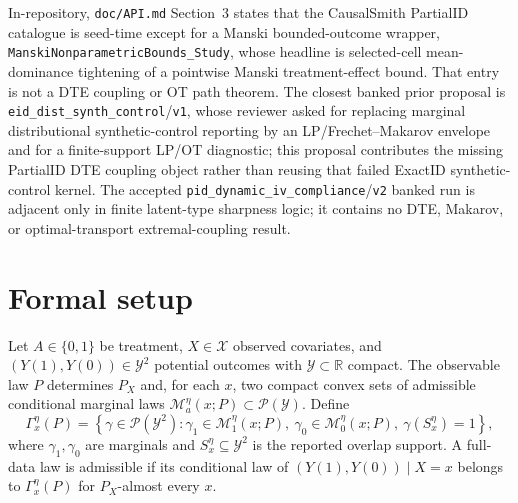 \documentclass[11pt]{article}
\theoremstyle{definition}
\theoremstyle{plain}
\theoremstyle{remark}
\begin{document}
In-repository, \texttt{doc/API.md} Section~3 states that the CausalSmith PartialID
catalogue is seed-time except for a Manski bounded-outcome wrapper,
\texttt{ManskiNonparametricBounds\_Study}, whose headline is selected-cell
mean-dominance tightening of a pointwise Manski treatment-effect bound.  That entry is
not a DTE coupling or OT path theorem.  The closest banked prior proposal is
\texttt{eid\_dist\_synth\_control}/\texttt{v1}, whose reviewer asked for replacing
marginal distributional synthetic-control reporting by an LP/Frechet--Makarov envelope
and for a finite-support LP/OT diagnostic; this proposal contributes the missing
PartialID DTE coupling object rather than reusing that failed ExactID synthetic-control
kernel.  The accepted \texttt{pid\_dynamic\_iv\_compliance}/\texttt{v2} banked run is
adjacent only in finite latent-type sharpness logic; it contains no DTE, Makarov, or
optimal-transport extremal-coupling result.

\section{Formal setup}\label{sec:setup}
Let \(A\in\{0,1\}\) be treatment, \(X\in\mathcal X\) observed covariates, and
\((Y(1),Y(0))\in\mathcal Y^2\) potential outcomes with \(\mathcal Y\subset\mathbb R\)
compact.  The observable law \(P\) determines \(P_X\) and, for each \(x\), two compact
convex sets of admissible conditional marginal laws
\(\mathcal M_a^\eta(x;P)\subset\mathcal P(\mathcal Y)\).  Define
\[
\Gamma^\eta_x(P)=
\left\{\gamma\in\mathcal P(\mathcal Y^2):
\gamma_1\in\mathcal M_1^\eta(x;P),\ \gamma_0\in\mathcal M_0^\eta(x;P),\
\gamma(S_x^\eta)=1\right\},
\]
where \(\gamma_1,\gamma_0\) are marginals and \(S_x^\eta\subseteq\mathcal Y^2\) is the
reported overlap support.  A full-data law is admissible if its conditional law of
\((Y(1),Y(0))\mid X=x\) belongs to \(\Gamma^\eta_x(P)\) for \(P_X\)-almost every \(x\).
\end{document}
